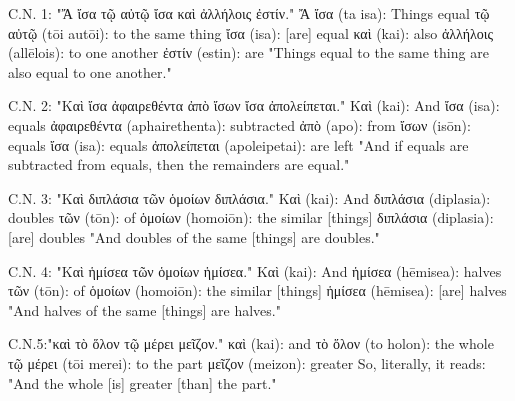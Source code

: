 C.N. 1: "Ἄ ἴσα τῷ αὐτῷ ἴσα καὶ ἀλλήλοις ἐστίν."
Ἄ ἴσα (ta isa): Things equal
τῷ αὐτῷ (tōi autōi): to the same thing
ἴσα (isa): [are] equal
καὶ (kai): also
ἀλλήλοις (allēlois): to one another
ἐστίν (estin): are
"Things equal to the same thing are also equal to one another."

C.N. 2: "Καὶ ἴσα ἀφαιρεθέντα ἀπὸ ἴσων ἴσα ἀπολείπεται."
Καὶ (kai): And
ἴσα (isa): equals
ἀφαιρεθέντα (aphairethenta): subtracted
ἀπὸ (apo): from
ἴσων (isōn): equals
ἴσα (isa): equals
ἀπολείπεται (apoleipetai): are left
"And if equals are subtracted from equals, then the remainders are equal."

C.N. 3: "Καὶ διπλάσια τῶν ὁμοίων διπλάσια."
Καὶ (kai): And
διπλάσια (diplasia): doubles
τῶν (tōn): of
ὁμοίων (homoiōn): the similar [things]
διπλάσια (diplasia): [are] doubles
"And doubles of the same [things] are doubles."

C.N. 4: "Καὶ ἡμίσεα τῶν ὁμοίων ἡμίσεα."
Καὶ (kai): And
ἡμίσεα (hēmisea): halves
τῶν (tōn): of
ὁμοίων (homoiōn): the similar [things]
ἡμίσεα (hēmisea): [are] halves
"And halves of the same [things] are halves."

C.N.5:"καὶ τὸ ὅλον τῷ μέρει μεῖζον." 
καὶ (kai): and
τὸ ὅλον (to holon): the whole
τῷ μέρει (tōi merei): to the part
μεῖζον (meizon): greater
So, literally, it reads: "And the whole [is] greater [than] the part."

